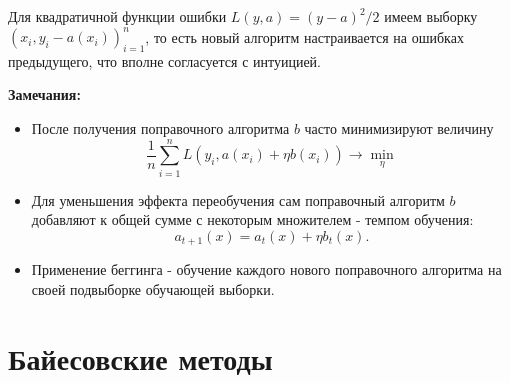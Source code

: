 Для квадратичной функции ошибки $L(y, a) = (y - a)^2/2$ имеем выборку $(x_i, y_i - a(x_i))_{i=1}^n$, то есть новый алгоритм настраивается на ошибках предыдущего, что вполне согласуется с интуицией.

\textbf{Замечания:}
\begin{itemize}
    \item После получения поправочного алгоритма $b$ часто минимизируют величину
$$
\frac{1}{n}\sum_{i=1}^nL(y_i, a(x_i) + \eta b(x_i)) \rightarrow \min_\eta
$$
    \item Для уменьшения эффекта переобучения сам поправочный алгоритм $b$ добавляют к общей сумме с некоторым множителем - темпом обучения:
$$
a_{t+1}(x) = a_t(x) + \eta b_t(x).
$$
    \item Применение беггинга - обучение каждого нового поправочного алгоритма на своей подвыборке обучающей выборки.
\end{itemize}


\section{Байесовские методы}



